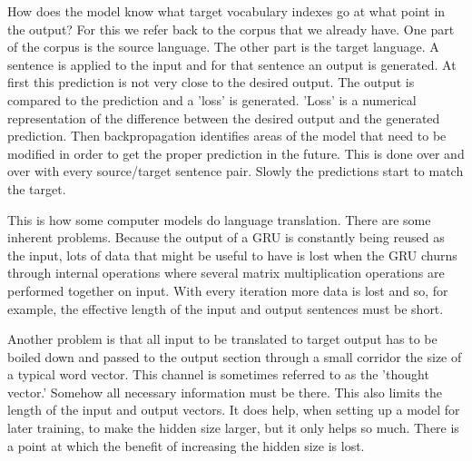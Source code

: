 How does the model know what target vocabulary indexes go at what point in the output? For this we refer back to the corpus that we already have. One part of the corpus is the source language. The other part is the target language. A sentence is applied to the input and for that sentence an output is generated. At first this prediction is not very close to the desired output. The output is compared to the prediction and a 'loss' is generated. 'Loss' is a numerical representation of the difference between the desired output and the generated prediction. Then backpropagation identifies areas of the model that need to be modified in order to get the proper prediction in the future. This is done over and over with every source/target sentence pair. Slowly the predictions start to match the target.

This is how some computer models do language translation. There are some inherent problems. Because the output of a GRU is constantly being reused as the input, lots of data that might be useful to have is lost when the GRU churns through internal operations where several matrix multiplication operations are performed together on input. With every iteration more data is lost and so, for example, the effective length of the input and output sentences must be short. 

Another problem is that all input to be translated to target output has to be boiled down and 
passed to the output section through a small corridor the size of a typical word vector. This channel is sometimes referred to as the 'thought vector.' Somehow all necessary information must be there. This also limits the length of the input and output vectors. It does help, when setting
up a model for later training, to make the hidden size larger, but it only helps so much. There is a point at which the benefit of increasing the hidden size is lost.